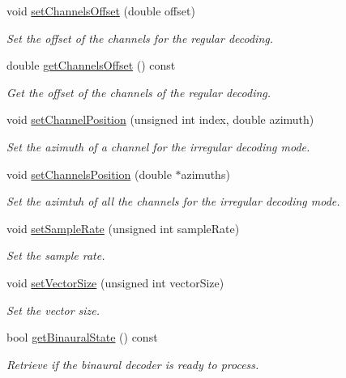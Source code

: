 \begin{DoxyCompactItemize}
void \hyperlink{class_hoa2_d_1_1_decoder_multi_a2cbf708c33f7bcb39895b058c1e139c1}{set\-Channels\-Offset} (double offset)
\begin{DoxyCompactList}\small\item\em Set the offset of the channels for the regular decoding. \end{DoxyCompactList}\item 
double \hyperlink{class_hoa2_d_1_1_decoder_multi_af31ea39af39be29e71f3b075470f16ad}{get\-Channels\-Offset} () const 
\begin{DoxyCompactList}\small\item\em Get the offset of the channels of the regular decoding. \end{DoxyCompactList}\item 
void \hyperlink{class_hoa2_d_1_1_decoder_multi_a42d2b7697ae84fd9ed43f8d1f4799dce}{set\-Channel\-Position} (unsigned int index, double azimuth)
\begin{DoxyCompactList}\small\item\em Set the azimuth of a channel for the irregular decoding mode. \end{DoxyCompactList}\item 
void \hyperlink{class_hoa2_d_1_1_decoder_multi_a226c24223ee381fd04dcbc44b4e8155e}{set\-Channels\-Position} (double $\ast$azimuths)
\begin{DoxyCompactList}\small\item\em Set the azimtuh of all the channels for the irregular decoding mode. \end{DoxyCompactList}\item 
void \hyperlink{class_hoa2_d_1_1_decoder_multi_aa15da12ba3889edc22ec9c148dd5c692}{set\-Sample\-Rate} (unsigned int sample\-Rate)
\begin{DoxyCompactList}\small\item\em Set the sample rate. \end{DoxyCompactList}\item 
void \hyperlink{class_hoa2_d_1_1_decoder_multi_a875eb671767c2f547453e6d7a1401f15}{set\-Vector\-Size} (unsigned int vector\-Size)
\begin{DoxyCompactList}\small\item\em Set the vector size. \end{DoxyCompactList}\item 
bool \hyperlink{class_hoa2_d_1_1_decoder_multi_a67e02e68e5ddaa18aa46e874ab5b6ad0}{get\-Binaural\-State} () const 
\begin{DoxyCompactList}\small\item\em Retrieve if the binaural decoder is ready to process. \end{DoxyCompactList}\item 

\end{DoxyCompactItemize}
